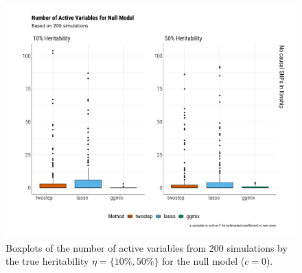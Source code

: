\documentclass[12pt,letter]{article}\usepackage[]{graphicx}\usepackage[]{color}
\newenvironment{knitrout}{}{} %
\begin{document}
\begin{knitrout}\scriptsize
{}\color{fgcolor}\begin{figure}[H]

{\centering \includegraphics[width=1\linewidth]{figure/plot-nactive-sim-null-model-1} 

}

\caption[Boxplots of the number of active variables from 200 simulations by the true heritability $\eta = \lbrace 10\%, 50\% \rbrace$ for the null model ($c=0$)]{Boxplots of the number of active variables from 200 simulations by the true heritability $\eta = \lbrace 10\%, 50\% \rbrace$ for the null model ($c=0$).}\label{fig:plot-nactive-sim-null-model}
\end{figure}


\end{knitrout}
\end{document}
